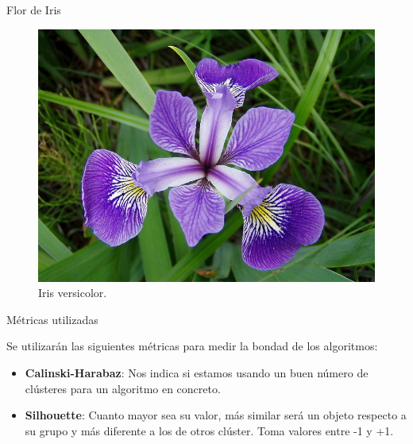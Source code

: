 \documentclass[spanish]{beamer}
\begin{document}
\begin{frame}{Flor de Iris}
\begin{figure}[h]
\begin{minipage}[h]{0.28\textwidth}
    \caption{Iris virginica.}
  \end{minipage}
  \hfill
  \begin{minipage}[h]{0.29\textwidth}
    \includegraphics[width=\textwidth]{dani/versicolor.jpg}
    \caption{Iris versicolor.}
  \end{minipage}
\end{figure}
\end{frame}

\begin{frame}{Métricas utilizadas}

Se utilizarán las siguientes métricas para medir la bondad de los algoritmos:\break
\begin{itemize}
\item \textbf{Calinski-Harabaz}: Nos indica si estamos usando un buen número de clústeres para un algoritmo en concreto.\break
\item \textbf{Silhouette}: Cuanto mayor sea su valor, más similar será un objeto respecto a su grupo y más diferente a los de otros clúster. Toma valores entre -1 y +1.
\end{itemize}
\end{frame}
\end{document}
